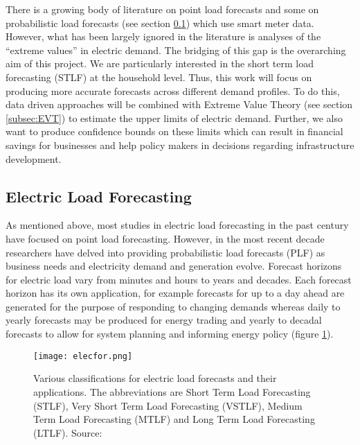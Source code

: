 \documentclass[a4paper]{article}
\begin{document}
There is a growing body of literature on point load forecasts and some on probabilistic load forecasts (see section \ref{subsec:litrev}) which use smart meter data. However, what has been largely ignored in the literature is analyses of the ``extreme values''  in electric demand. The bridging of this gap is the overarching aim of this project. We are particularly interested in the short term load forecasting (STLF) at the household level. Thus, this work will focus on producing more accurate forecasts across different demand profiles. To do this, data driven approaches will be combined with Extreme Value Theory (see section \ref{subsec:EVT}) to estimate the upper limits of electric demand. Further, we also want to produce confidence bounds on these limits which can result in financial savings for businesses and help policy makers in decisions regarding infrastructure development. %




\subsection{Electric Load Forecasting}
\label{subsec:litrev}
As mentioned above, most studies in electric load forecasting in the past century have focused on point load forecasting. However, in the most recent decade researchers have delved into providing probabilistic load forecasts (PLF) as business needs and electricity demand and generation evolve. Forecast horizons for electric load vary from minutes and hours to years and decades. Each forecast horizon has its own application, for example forecasts for up to a day ahead are generated for the purpose of responding to changing demands whereas daily to yearly forecasts may be produced for energy trading and yearly to decadal forecasts to allow for system planning and informing energy policy (figure \ref{fig:elecfor}).

\begin{figure}
\centering
\texttt{[image: elecfor.png]}
\caption{Various classifications for electric load forecasts and their applications. The abbreviations are Short Term Load Forecasting (STLF), Very Short Term Load Forecasting (VSTLF), Medium Term Load Forecasting (MTLF) and Long Term Load Forecasting (LTLF). Source: \citet{hong16}}
\label{fig:elecfor} 
\end{figure}
\end{document}

